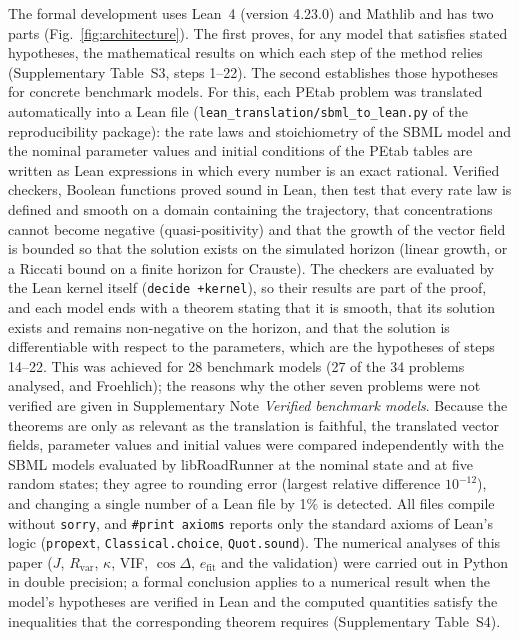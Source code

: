 \documentclass[pdflatex,sn-nature]{sn-jnl}
\theoremstyle{plain}
\begin{document}
The formal development uses Lean~4 (version 4.23.0) and Mathlib\cite{bib19,bib21} and has two parts (Fig.~\ref{fig:architecture}). The first proves, for any model that satisfies stated hypotheses, the mathematical results on which each step of the method relies (Supplementary Table~S3, steps 1--22). The second establishes those hypotheses for concrete benchmark models. For this, each PEtab problem was translated automatically into a Lean file (\texttt{lean\_translation/sbml\_to\_lean.py} of the reproducibility package): the rate laws and stoichiometry of the SBML model and the nominal parameter values and initial conditions of the PEtab tables are written as Lean expressions in which every number is an exact rational. Verified checkers, Boolean functions proved sound in Lean, then test that every rate law is defined and smooth on a domain containing the trajectory, that concentrations cannot become negative (quasi-positivity) and that the growth of the vector field is bounded so that the solution exists on the simulated horizon (linear growth, or a Riccati bound on a finite horizon for Crauste). The checkers are evaluated by the Lean kernel itself (\texttt{decide +kernel}), so their results are part of the proof, and each model ends with a theorem stating that it is smooth, that its solution exists and remains non-negative on the horizon, and that the solution is differentiable with respect to the parameters, which are the hypotheses of steps 14--22. This was achieved for 28 benchmark models (27 of the 34 problems analysed, and Froehlich); the reasons why the other seven problems were not verified are given in Supplementary Note \textit{Verified benchmark models}. Because the theorems are only as relevant as the translation is faithful, the translated vector fields, parameter values and initial values were compared independently with the SBML models evaluated by libRoadRunner at the nominal state and at five random states; they agree to rounding error (largest relative difference $10^{-12}$), and changing a single number of a Lean file by 1\% is detected. All files compile without \texttt{sorry}, and \texttt{\#print axioms} reports only the standard axioms of Lean's logic (\texttt{propext}, \texttt{Classical.choice}, \texttt{Quot.sound}). The numerical analyses of this paper ($J$, $R_{\mathrm{var}}$, $\kappa$, VIF, $\cos\Delta$, $e_{\mathrm{fit}}$ and the validation) were carried out in Python in double precision; a formal conclusion applies to a numerical result when the model's hypotheses are verified in Lean and the computed quantities satisfy the inequalities that the corresponding theorem requires (Supplementary Table~S4).
\end{document}
